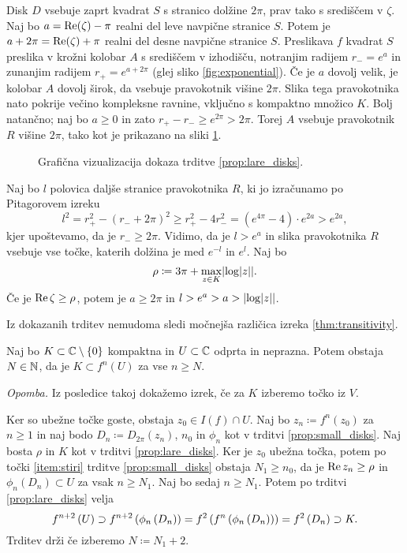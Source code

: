 \begin{dokaz}
    Disk \(D\) vsebuje zaprt kvadrat \(S\) s stranico dolžine \(2 \pi\), prav tako s središčem v \(\zeta\). Naj bo \(a = \operatorname{Re} (\zeta) - \pi\) realni del leve navpične stranice \(S\). Potem je \(a + 2 \pi = \operatorname{Re} (\zeta) + \pi\) realni del desne navpične stranice \(S\). Preslikava \(f\) kvadrat \(S\) preslika v krožni kolobar \(A\) s središčem v izhodišču, notranjim radijem \(r_{-} = e^a\) in zunanjim radijem \(r_{+} = e^{a + 2 \pi}\) (glej sliko \ref{fig:exponential}). Če je \(a\) dovolj velik, je kolobar \(A\) dovolj širok, da vsebuje pravokotnik višine \(2 \pi\). Slika tega pravokotnika nato pokrije večino kompleksne ravnine, vključno s kompaktno množico \(K\). Bolj natančno; naj bo \(a \geq 0\) in zato \(r_+ - r_- \geq e^{2 \pi} > 2 \pi\). Torej \(A\) vsebuje pravokotnik \(R\) višine \(2 \pi\), tako kot je prikazano na sliki \ref{fig:transitivity}.
    \begin{figure}%
        \centering
        
        \caption{Grafična vizualizacija dokaza trditve \ref{prop:lare_disks}.}
        \label{fig:transitivity}
    \end{figure}
    Naj bo \(l\) polovica daljše stranice pravokotnika \(R\), ki jo izračunamo po Pitagorovem izreku
    \[l^2 = r_+^2 - (r_- + 2 \pi)^2 \geq r_+^2 - 4 r_-^2 = (e^{4 \pi} - 4) \cdot e^{2 a} > e^{2 a},\]
    kjer upoštevamo, da je \(r_- \geq 2 \pi\). Vidimo, da je \(l > e^a\) in slika pravokotnika \(R\) vsebuje vse točke, katerih dolžina je med \(e^{- l}\) in \(e^l\). Naj bo
    \[\rho \coloneq 3 \pi + \max_{z \in K} \abs{ \log \abs{z} }.\]
    Če je \(\operatorname{Re} \zeta \geq \rho\), potem je \(a \geq 2 \pi\) in \(l > e^a > a > \abs{\log \abs{z}}\).
\end{dokaz}

\noindent Iz dokazanih trditev nemudoma sledi močnejša različica izreka \ref{thm:transitivity}.

\begin{posledica}
    Naj bo \(K \subset \mathbb C \setminus \left\{ 0 \right\}\) kompaktna in \(U \subset \mathbb C\) odprta in neprazna. Potem obstaja \(N \in \mathbb N\), da je \(K \subset f^n (U)\) za vse \(n \geq N\).
\end{posledica}

\noindent \textit{Opomba.} Iz posledice takoj dokažemo izrek, če za \(K\) izberemo točko iz \(V\).

\begin{dokaz}
    Ker so ubežne točke goste, obstaja \(z_0 \in I (f) \cap U\). Naj bo \(z_n \coloneq f^n (z_0)\) za \(n \geq 1\) in naj bodo \(D_n \coloneq D_{2 \pi} (z_n)\), \(n_0\) in \(\phi_n\) kot v trditvi \ref{prop:small_disks}. Naj bosta \(\rho\) in \(K\) kot v trditvi \ref{prop:lare_disks}. Ker je \(z_0\) ubežna točka, potem po točki \ref{item:stiri} trditve \ref{prop:small_disks} obstaja \(N_1 \geq n_0\), da je \(\operatorname{Re} z_n \geq \rho\) in \(\phi_n (D_n) \subset U\) za vsak \(n \geq N_1\). Naj bo sedaj \(n \geq N_1\). Potem po trditvi \ref{prop:lare_disks} velja
    \[f^{n + 2} \left( U \right) \supset f^{n + 2} \left( \phi_n \left( D_n \right) \right) = f^2 \left( f^n \left( \phi_n \left( D_n \right) \right) \right) = f^2 \left( D_n \right) \supset K.\]
    Trditev drži če izberemo \(N \coloneq N_1 + 2\).
\end{dokaz}

